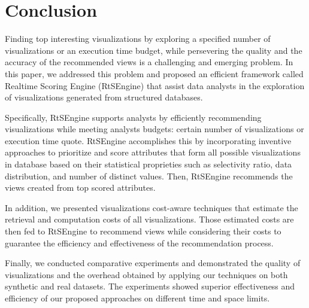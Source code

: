 \section{Conclusion}
%
Finding top interesting visualizations by exploring a specified number of visualizations or an execution time budget, while persevering the quality and the accuracy of the recommended views is a challenging and emerging problem. 
%
In this paper, we addressed this problem and proposed an efficient framework called Realtime Scoring Engine (RtSEngine) that assist data analysts in the exploration of visualizations generated from structured databases.
%

Specifically, RtSEngine supports analysts by efficiently recommending visualizations while meeting analysts budgets: certain number of visualizations or execution time quote.
%
%
RtSEngine accomplishes this by incorporating inventive approaches to prioritize and score attributes that form all possible visualizations in database based on their statistical proprieties such as selectivity ratio, data distribution, and number of distinct values.
%
Then, RtSEngine recommends the views created from top scored attributes.
%

In addition, we presented visualizations cost-aware techniques that estimate the retrieval and computation costs of all visualizations.
%
Those estimated costs are then fed to RtSEngine to recommend views while considering their costs to guarantee the efficiency and effectiveness of the recommendation process. 
%
%
%

Finally, we conducted comparative experiments and demonstrated the quality of visualizations and the overhead obtained by applying our techniques on both synthetic and real datasets.
%
The experiments showed superior effectiveness and efficiency of our proposed approaches on different time and space limits. 